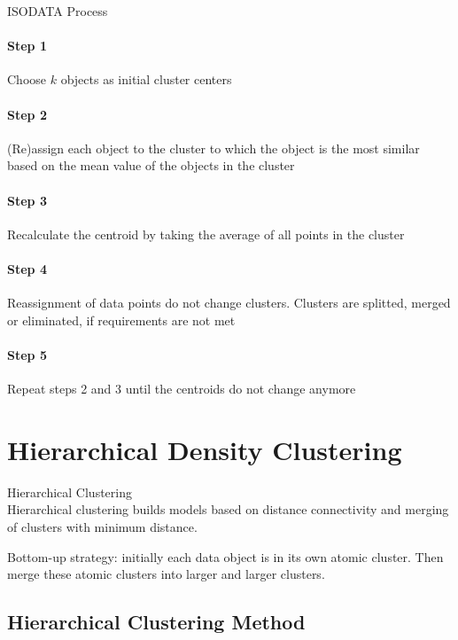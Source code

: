 \begin{KR}{ISODATA Process}\\
\paragraph{Step 1}
Choose $k$ objects as initial cluster centers

\paragraph{Step 2}
(Re)assign each object to the cluster to which the object is the most similar based on the mean value of the objects in the cluster

\paragraph{Step 3}
Recalculate the centroid by taking the average of all points in the cluster

\paragraph{Step 4}
Reassignment of data points do not change clusters. Clusters are splitted, merged or eliminated, if requirements are not met

\paragraph{Step 5}
Repeat steps 2 and 3 until the centroids do not change anymore
\end{KR}

\section{Hierarchical Density Clustering}

\begin{definition}{Hierarchical Clustering}\\
Hierarchical clustering builds models based on distance connectivity and merging of clusters with minimum distance.

Bottom-up strategy: initially each data object is in its own atomic cluster. Then merge these atomic clusters into larger and larger clusters.
\end{definition}

\subsection{Hierarchical Clustering Method}

